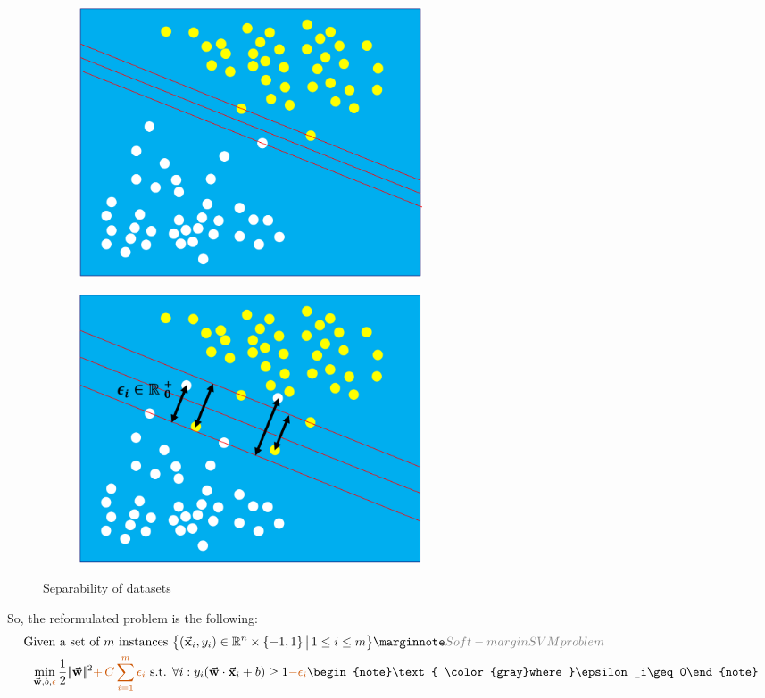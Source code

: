 \begin{figure}[H]
  
  \begin{subfigure}{0.47\textwidth}
    \centering
    \includegraphics[width=0.55\textwidth]{assets/svm/sm__separation_reduced_margin.png}
    \vspace*{0.5cm}
  \end{subfigure}\hspace*{0.05\textwidth}
  \begin{subfigure}{0.47\textwidth}
    \centering
    \includegraphics[width=0.55\textwidth]{assets/svm/sm__separation_slack.png}
  \end{subfigure}

  \caption{Separability of datasets}
  \label{fig:5_not_separable}
\end{figure}

So, the reformulated problem is the following:
\begin{align*}\begin{aligned}
  \text{Given a set of } m \text{ instances }& \big\{ (\cv{x}_i, y_i) \in \mathbb{R}^n\times\{-1,1\} \,\big|\, 1\leq i\leq m \big\}\sidenote{Soft-margin SVM problem}\\
  \min_{\cv{w}, b, {\color{burntorange}\epsilon}}\frac{1}{2}\norm{\cv{w}}^2 {\color{burntorange}+\, C\sum_{i=1}^m\epsilon_i} \text{ s.t. } &\forall i: y_i(\cv{w}\cdot\cv{x}_i + b) \geq 1 {\color{burntorange}-\epsilon_i} \begin{note}\text{ \color{gray}where }\epsilon_i\geq0\end{note}
\end{aligned}\end{align*}

